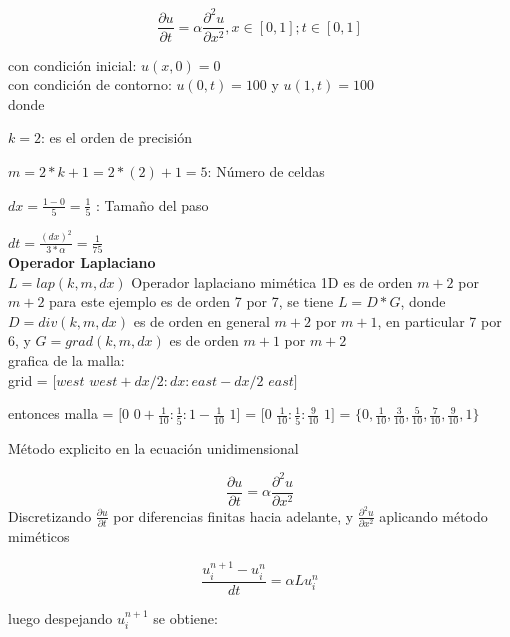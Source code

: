 \documentclass[a4paper,abstract=true]{scrreprt}
\begin{document}
\begin{equation}
	\frac{\partial u}{\partial t} = \alpha \frac{\partial^{2} u}{\partial x^{2}},   x \in [0,1] ; t \in [0,1]
\end{equation}

con condición inicial: $u(x,0) = 0$\\

con condición de contorno: $u(0,t)= 100$ y $u(1,t) =100$\\

donde 

$k = 2$: es el orden de precisión

 $m = 2*k+1=2*(2)+1 = 5$: Número de celdas
 
$dx =\frac{1-0}{5} =\frac{1}{5}$ : Tamaño del paso 

$dt = \frac{(dx)^{2}}{3*\alpha} =\frac{1}{75}$\\

\textbf{\textbf{Operador Laplaciano}}\\

$L = lap(k,m,dx)$  Operador laplaciano mimética 1D es de orden $m+2$ por $m+2$ para este ejemplo es de orden  7 por 7,  se tiene $L = D* G$, donde $D = div(k,m,dx)$ es de orden en general $m+2$ por $m+1$, en particular 7 por 6, y $G = grad(k,m,dx)$ es de orden $m+1$ por $m+2$\\


grafica de la malla:\\


 grid = $[west$  $west+dx/2: dx :east-dx/2$  $east]$
 
entonces malla = $[0$ $0+\frac{1}{10}: \frac{1}{5}: 1-\frac{1}{10}$ $1  ]$ = $[0$ $\frac{1}{10}: \frac{1}{5}: \frac{9}{10}$ $1]$ = $  \{0, \frac{1}{10}, \frac{3}{10}, \frac{5}{10}, \frac{7}{10}, \frac{9}{10}, 1 \}$


Método explicito en la ecuación unidimensional

\begin{equation}
	\frac{\partial u}{\partial t} = \alpha \frac{\partial^{2} u}{\partial x^{2}}
\end{equation}
Discretizando  $\frac{\partial u}{\partial t}$ por diferencias finitas hacia adelante, y $\frac{\partial^{2} u}{\partial x^{2}}$ aplicando método miméticos

\begin{equation}	
	\frac{u^{n+1}_{i} - u^{n}_{i} }{dt} = \alpha L 	u^{n}_{i}
\end{equation}

 luego despejando $u^{n+1}_{i}$ se obtiene:
 
\end{document}
